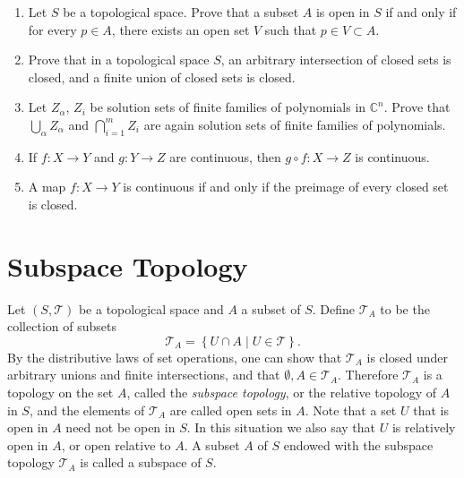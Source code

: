 \begin{enumerate}
	\item
    \begin{proposition}
      \label{ex:open_criterion} Let $S$ be a topological space. Prove that
		      a subset $A$ is open in $S$ if and only if for every $p\in A$, there
		      exists an open set $V$ such that $p\in V\subset A$.
	    \end{proposition}

	\item
	      Prove that in a topological space $S$, an arbitrary intersection of
	      closed sets is closed, and a finite union of closed sets is closed.

	\item Let $Z_\alpha$, $Z_i$ be solution sets of finite families of
	      polynomials in $\mathbb{C}^n$. Prove that $\bigcup_\alpha Z_\alpha$
	      and $\bigcap_{i=1}^m Z_i$ are again solution sets of finite families
	      of polynomials.


	\item  If $f:X\to Y$ and $g:Y\to Z$ are continuous, then $g\circ f: X\to
		      Z$ is continuous.


	\item A map $f:X\to Y$ is continuous if and only if the preimage of every
	      closed set is closed.

\end{enumerate}








\section{Subspace Topology}\label{subsec:subspace_top}

Let $(S,\mathcal{T})$ be a topological space and $A$ a subset of $S$. Define
$\mathcal{T}_A$ to be the collection of subsets
\begin{displaymath}
	\mathcal{T}_A = \left\{U\cap A\; | \; U\in\mathcal{T}\right\}.
\end{displaymath}
By the distributive laws of set operations, one can show that $\mathcal{T}_A$
is closed under arbitrary unions and finite intersections, and that
$\emptyset,A \in\mathcal{T}_A$. Therefore $\mathcal{T}_A$ is a topology on
the set $A$, called the \emph{subspace topology}, or the relative topology of
$A$ in $S$, and the elements of $\mathcal{T}_A$ are called open sets in $A$.
Note that a set $U$ that is open in $A$ need not be open in $S$. In this
situation we also say that $U$ is relatively open in $A$, or open relative to
$A$. A subset $A$ of $S$ endowed with the subspace topology $\mathcal{T}_A$
is called a subspace of $S$.


